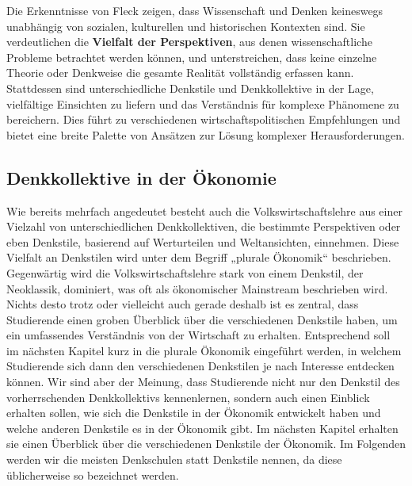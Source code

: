 \documentclass[
  nswissgerman,
  a4paper,
  DIV=11,
  numbers=noendperiod,
  oneside,
  openany]{scrreprt}
\begin{document}
Die Erkenntnisse von Fleck zeigen, dass Wissenschaft und Denken
keineswegs unabhängig von sozialen, kulturellen und historischen
Kontexten sind. Sie verdeutlichen die \textbf{Vielfalt der
Perspektiven}, aus denen wissenschaftliche Probleme betrachtet werden
können, und unterstreichen, dass keine einzelne Theorie oder Denkweise
die gesamte Realität vollständig erfassen kann. Stattdessen sind
unterschiedliche Denkstile und Denkkollektive in der Lage, vielfältige
Einsichten zu liefern und das Verständnis für komplexe Phänomene zu
bereichern. Dies führt zu verschiedenen wirtschaftspolitischen
Empfehlungen und bietet eine breite Palette von Ansätzen zur Lösung
komplexer Herausforderungen.

\subsection{Denkkollektive in der
Ökonomie}\label{denkkollektive-in-der-uxf6konomie}

Wie bereits mehrfach angedeutet besteht auch die Volkswirtschaftslehre
aus einer Vielzahl von unterschiedlichen Denkkollektiven, die bestimmte
Perspektiven oder eben Denkstile, basierend auf Werturteilen und
Weltansichten, einnehmen. Diese Vielfalt an Denkstilen wird unter dem
Begriff „plurale Ökonomik`` beschrieben. Gegenwärtig wird die
Volkswirtschaftslehre stark von einem Denkstil, der Neoklassik,
dominiert, was oft als ökonomischer Mainstream beschrieben wird. Nichts
desto trotz oder vielleicht auch gerade deshalb ist es zentral, dass
Studierende einen groben Überblick über die verschiedenen Denkstile
haben, um ein umfassendes Verständnis von der Wirtschaft zu erhalten.
Entsprechend soll im nächsten Kapitel kurz in die plurale Ökonomik
eingeführt werden, in welchem Studierende sich dann den verschiedenen
Denkstilen je nach Interesse entdecken können. Wir sind aber der
Meinung, dass Studierende nicht nur den Denkstil des vorherrschenden
Denkkollektivs kennenlernen, sondern auch einen Einblick erhalten
sollen, wie sich die Denkstile in der Ökonomik entwickelt haben und
welche anderen Denkstile es in der Ökonomik gibt. Im nächsten Kapitel
erhalten sie einen Überblick über die verschiedenen Denkstile der
Ökonomik. Im Folgenden werden wir die meisten Denkschulen statt
Denkstile nennen, da diese üblicherweise so bezeichnet werden.
\end{document}
